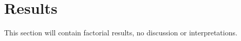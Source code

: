 \documentclass[../main.tex]{subfiles}
\begin{document}
    \section{Results}\label{sec:results}
    This section will contain factorial results, no discussion or interpretations.
\end{document}
